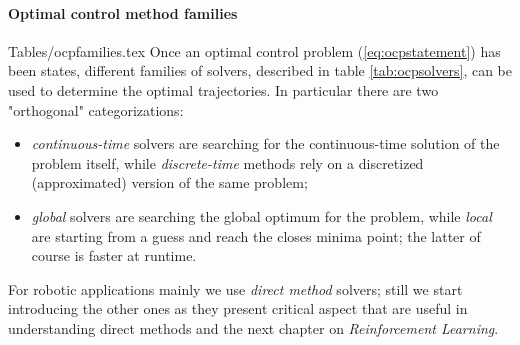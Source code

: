 	\paragraph{Optimal control method families} {Tables/ocpfamilies.tex}
	Once an optimal control problem (\ref{eq:ocpstatement}) has been states, different families of solvers, described in table \ref{tab:ocpsolvers}, can be used to determine the optimal trajectories. In particular there are two "orthogonal" categorizations:
	\begin{itemize}
		\item \textit{continuous-time} solvers are searching for the continuous-time solution of the problem itself, while \textit{discrete-time} methods rely on a discretized (approximated) version of the same problem;
		\item \textit{global} solvers are searching the global optimum for the problem, while \textit{local} are starting from a guess and reach the closes minima point; the latter of course is faster at runtime.
	\end{itemize}
	
	For robotic applications mainly we use \textit{direct method} solvers; still we start introducing the other ones as they present critical aspect that are useful in understanding direct methods and the next chapter on \textit{Reinforcement Learning}.
	
